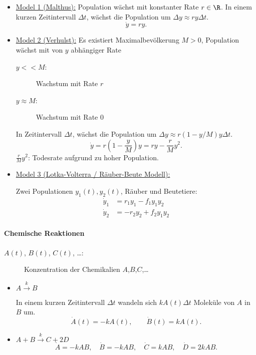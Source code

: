 \documentclass[
]{mycourse}
\theoremstyle{mythm}
\theoremstyle{break}
\begin{document}
\begin{itemize}
\item \underline{Model 1 (Malthus):} Population wächst mit konstanter Rate $r\in \R$. 
In einem kurzen Zeitintervall $\Delta t$, wächst die Population um $\Delta y \approx r y \Delta t$.
\[
\dot y=r y.
\]

\item \underline{Model 2 (Verhulst):} Es existiert Maximalbevölkerung $M>0$, Population wächst mit von $y$ abhängiger Rate
\begin{description}
\item[$y<<M $:] Wachstum mit Rate $r$
\item[$y\approx M$:] Wachstum mit Rate $0$
\end{description}
In Zeitintervall $\Delta t$, wächst die Population um $\Delta y \approx r (1-y/M) y \Delta t$.
\[
\dot y=r\left( 1- \frac{y}{M} \right) y=r y - \frac{r}{M} y^2.
\]
$\frac{r}{M} y^2$: Todesrate aufgrund zu hoher Population.
%
\item \underline{Model 3 (Lotka-Volterra / Räuber-Beute Modell):}

Zwei Populationen $y_1(t), y_2(t)$, Räuber und Beutetiere:
\begin{align*}
\dot y_1 &= r_1 y_1 - f_1 y_1 y_2\\
\dot y_2 &= - r_2 y_2  + f_2 y_1 y_2
\end{align*}
\end{itemize}
%
\paragraph{Chemische Reaktionen}

\begin{description}
\item[$A(t)$, $B(t)$, $C(t)$, \ldots:] Konzentration der Chemikalien $A$,$B$,$C$,\ldots 
\end{description}

\begin{itemize}
\item $A \stackrel{k}{\longrightarrow} B$

In einem kurzen Zeitintervall $\Delta t$ wandeln sich $kA(t) \Delta t$ Moleküle von $A$ in $B$ um.
\[
\dot A(t)=-kA(t), \qquad \dot B(t)=kA(t).
\]

\item $A  + B \stackrel{k}{\longrightarrow} C + 2D$
\[
\dot A=-kA B, \quad \dot B=-kAB, \quad \dot C=kAB, \quad \dot D=2kAB.
\]
\end{itemize}
%
\end{document}
